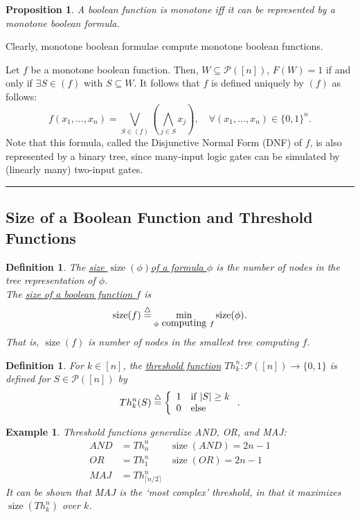 \documentclass[twoside]{article}
\newcounter{tnum}
\newtheorem{proposition}[tnum]{Proposition}
\newtheorem{definition}[tnum]{Definition}
\newtheorem{example}[tnum]{Example}
\newenvironment{proof}{{\bf Proof:}}{\hfill\rule{2mm}{2mm}}
\newcommand\ul{\underline}
\newcommand\pow[1]{\mathcal{P} \left( #1 \right)}
\newcommand\size{\operatorname{size}}
\begin{document}
\begin{proposition}
A boolean function is monotone iff it can be represented by a monotone boolean
formula.
\end{proposition}

\begin{proof}
Clearly, monotone boolean formulae compute monotone boolean functions.

Let $f$ be a monotone boolean function. Then, $W \subseteq \pow{[n]}$,
$F(W) = 1$ if and only if $\exists S \in (f)$ with $S \subseteq W$. It follows
that $f$ is defined uniquely by $(f)$ as follows:
\[f(x_1,\dots,x_n)
    = \bigvee_{S \in (f)} \left( \bigwedge_{j \in S} x_j \right), \quad
                                    \forall (x_1,\dots,x_n) \in \{0,1\}^n .\]
Note that this formula, called the Disjunctive Normal Form (DNF) of $f$, is
also represented by a binary tree, since many-input logic gates can be
simulated by (linearly many) two-input gates.
\end{proof}

\subsection{Size of a Boolean Function and Threshold Functions}
\begin{definition}
The \ul{size $\size(\phi)$of a formula $\phi$} is the number of nodes in the tree
representation of $\phi$. \\The \ul{size of a boolean function $f$} is
\[ \size(f)
    \buildrel\triangle\over =
        \min_{\phi \mbox{ computing } f} \size(\phi).
\]
That is, $\size(f)$ is number of nodes in the smallest tree computing $f$.
\end{definition}

\begin{definition}
For $k \in [n]$, the \ul{threshold function}
$Th_k^n : \pow{[n]} \rightarrow \{0,1\}$ is defined for $S \in \pow{[n]}$ by
\[ Th_k^n(S)
    \buildrel\triangle\over =
    \left\{
        \begin{array}{cl}
            1 & \mbox{if $|S| \geq k$} \\
            0 & \mbox{else}
        \end{array}
    \right..
\]
\end{definition}

\begin{example}
\normalfont
Threshold functions generalize AND, OR, and MAJ:
\begin{align*}
    AND & = Th_n^n & \size(AND) = 2n - 1 \\
    OR  & = Th_1^n &  \size(OR) = 2n - 1 \\
    MAJ & = Th_{\lceil n/2 \rceil}^n
\end{align*}
It can be shown that MAJ is the `most complex' threshold, in that it
maximizes $\size(Th_k^n)$ over $k$.
\end{example}
\end{document}
